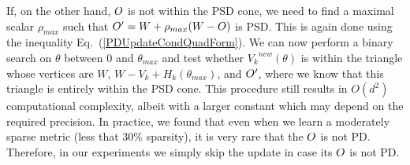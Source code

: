 \documentclass[twoside,11pt]{article}
\newcommand\mat[1]{{#1}}
\renewcommand\vec[1]{\mathbf{#1}}
\newcommand{\W}{\mat{W}}
\newcommand{\newW}{{\mat{W^{new}}}}
\newcommand{\Hk}{H_k}
\newcommand{\Vk}{\mat{V_k}}
\renewcommand{\eqref}[1]{Eq.~(\ref{#1})}
\begin{document}
If, on the other hand, $\Vkorigin$ is not within the PSD cone, we need to find a maximal scalar $\rho_{max}$ such that $\Vkorigin' = W + \rho_{max}(W-\Vkorigin)$ is PSD. This is again done using the inequality \eqref{PDUpdateCondQuadForm}. We can now perform a binary search on $\theta$ between $0$ and $\theta_{max}$ and test whether $\Vk^{new}(\theta)$ is within the triangle whose vertices are $W$, $W-\Vk + \Hk(\theta_{max})$, and $\Vkorigin'$, where we know that this triangle is entirely within the PSD cone. This procedure still results in $O(d^2)$ computational complexity, albeit with a larger constant which may depend on the required precision. In practice, we found that even when we learn a moderately sparse metric (less that $30\%$ sparsity), it is very rare that the $\Vkorigin$ is not PD. Therefore, in our experiments we simply skip the update in case its $\Vkorigin$ is not PD.




\end{document}
